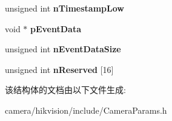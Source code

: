 \begin{DoxyCompactItemize}
unsigned int {\bfseries n\+Timestamp\+Low}
\item 
\mbox{\label{struct___m_v___e_v_e_n_t___o_u_t___i_n_f_o___a0a1f362fdac49bfe6f097f17c1977e31}} 
void $\ast$ {\bfseries p\+Event\+Data}
\item 
\mbox{\label{struct___m_v___e_v_e_n_t___o_u_t___i_n_f_o___a1eb4d8cd4c4fc02f48ad9dcfea826ebd}} 
unsigned int {\bfseries n\+Event\+Data\+Size}
\item 
\mbox{\label{struct___m_v___e_v_e_n_t___o_u_t___i_n_f_o___a2f81c3c7494ee3b63e39b34c69295898}} 
unsigned int {\bfseries n\+Reserved} \mbox{[}16\mbox{]}
\end{DoxyCompactItemize}


该结构体的文档由以下文件生成\+:\begin{DoxyCompactItemize}
\item 
camera/hikvision/include/Camera\+Params.\+h\end{DoxyCompactItemize}
